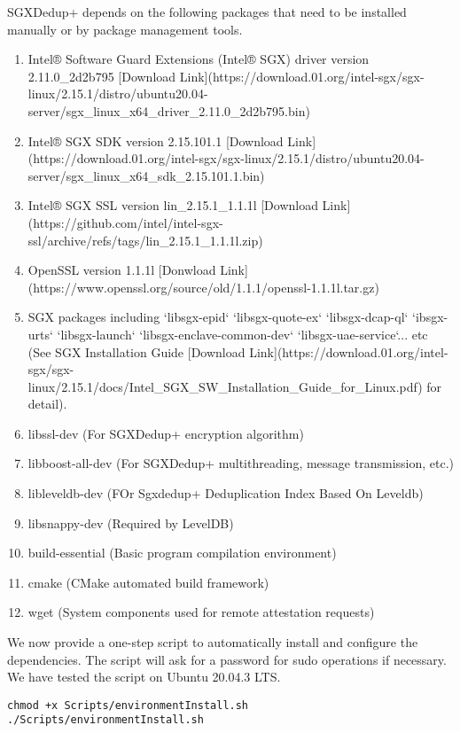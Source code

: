SGXDedup+ depends on the following packages that need to be installed manually or by package management tools.
\begin{enumerate}
    \item Intel® Software Guard Extensions (Intel® SGX) driver version 2.11.0\_2d2b795 [Download Link](https://download.01.org/intel-sgx/sgx-linux/2.15.1/distro/ubuntu20.04-server/sgx\_linux\_x64\_driver\_2.11.0\_2d2b795.bin)
    \item Intel® SGX SDK version 2.15.101.1 [Download Link](https://download.01.org/intel-sgx/sgx-linux/2.15.1/distro/ubuntu20.04-server/sgx\_linux\_x64\_sdk\_2.15.101.1.bin)
    \item Intel® SGX SSL version lin\_2.15.1\_1.1.1l [Download Link](https://github.com/intel/intel-sgx-ssl/archive/refs/tags/lin\_2.15.1\_1.1.1l.zip)
    \item OpenSSL version 1.1.1l [Donwload Link](https://www.openssl.org/source/old/1.1.1/openssl-1.1.1l.tar.gz)
    \item SGX packages including `libsgx-epid` `libsgx-quote-ex` `libsgx-dcap-ql` `ibsgx-urts` `libsgx-launch` `libsgx-enclave-common-dev` `libsgx-uae-service`... etc (See SGX Installation Guide [Download Link](https://download.01.org/intel-sgx/sgx-linux/2.15.1/docs/Intel\_SGX\_SW\_Installation\_Guide\_for\_Linux.pdf) for detail).
    \item libssl-dev (For SGXDedup+ encryption algorithm)
    \item libboost-all-dev (For SGXDedup+ multithreading, message transmission, etc.)
    \item libleveldb-dev (FOr Sgxdedup+ Deduplication Index Based On Leveldb)
    \item libsnappy-dev (Required by LevelDB)
    \item build-essential (Basic program compilation environment)
    \item cmake (CMake automated build framework)
    \item wget (System components used for remote attestation requests)
\end{enumerate}

We now provide a one-step script to automatically install and configure the dependencies. The script will ask for a password for sudo operations if necessary. We have tested the script on Ubuntu 20.04.3 LTS.

\begin{lstlisting}[style=shell]
chmod +x Scripts/environmentInstall.sh
./Scripts/environmentInstall.sh
\end{lstlisting}

